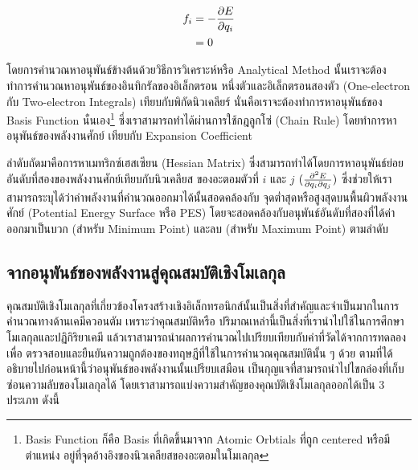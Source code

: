\begin{align}
    f_{i} &= - \pdv{E}{q_{i}} \\
    &= 0
\end{align}

โดยการคำนวณหาอนุพันธ์ข้างต้นด้วยวิธีการวิเคราะห์หรือ Analytical Method นั้นเราจะต้องทำการคำนวณหาอนุพันธ์ของอินทิกรัลของอิเล็กตรอน%
หนึ่งตัวและอิเล็กตรอนสองตัว (One-electron กับ Two-electron Integrals) เทียบกับพิกัดนิวเคลียร์ นั่นคือเราจะต้องทำการหาอนุพันธ์ของ 
Basis Function นั่นเอง\footnote{Basis Function ก็คือ Basis ที่เกิดขึ้นมาจาก Atomic Orbtials ที่ถูก centered หรือมีตำแหน่ง%
อยู่ที่จุดอ้างอิงของนิวเคลียสของอะตอมในโมเลกุล} ซึ่งเราสามารถทำได้ผ่านการใช้กฎลูกโซ่ (Chain Rule) โดยทำการหาอนุพันธ์ของพลังงานศักย์%
เทียบกับ Expansion Coefficient

ลำดับถัดมาคือการหาเมทริกซ์เฮสเซียน (Hessian Matrix) ซึ่งสามารถทำได้โดยการหาอนุพันธ์ย่อยอันดับที่สองของพลังงานศักย์เทียบกับนิวเคลียส%
ของอะตอมตัวที่ $i$ และ $j$ $(\pdv{E}{q_{i}}{q_{j}})$ ซึ่งช่วยให้เราสามารถระบุได้ว่าค่าพลังงานที่คำนวณออกมาได้นั้นสอดคล้องกับ%
จุดต่ำสุดหรือสูงสุดบนพื้นผิวพลังงานศักย์ (Potential Energy Surface หรือ PES) โดยจะสอดคล้องกับอนุพันธ์อันดับที่สองที่ได้ค่าออกมาเป็นบวก 
(สำหรับ Minimum Point) และลบ (สำหรับ Maximum Point) ตามลำดับ

\subsection{จากอนุพันธ์ของพลังงานสู่คุณสมบัติเชิงโมเลกุล}
\label{ssec:ener_der_mol_prop}

คุณสมบัติเชิงโมเลกุลที่เกี่ยวข้องโครงสร้างเชิงอิเล็กทรอนิกส์นั้นเป็นสิ่งที่สำคัญและจำเป็นมากในการคำนวณทางด้านเคมีควอนตัม เพราะว่าคุณสมบัติหรือ%
ปริมาณเหล่านี้เป็นสิ่งที่เรานำไปใช้ในการศึกษาโมเลกุลและปฏิกิริยาเคมี แล้วเราสามารถนำผลการคำนวณไปเปรียบเทียบกับค่าที่วัดได้จากการทดลองเพื่อ%
ตรวจสอบและยืนยันความถูกต้องของทฤษฎีที่ใช้ในการคำนวณคุณสมบัตินั้น ๆ ด้วย ตามที่ได้อธิบายไปก่อนหน้านี้ว่าอนุพันธ์ของพลังงานนั้นเปรียบเสมือน%
เป็นกุญแจที่สามารถนำไปไขกล่องที่เก็บซ่อนความลับของโมเลกุลได้ โดยเราสามารถแบ่งความสำคัญของคุณบัติเชิงโมเลกุลออกได้เป็น 3 ประเภท ดังนี้


